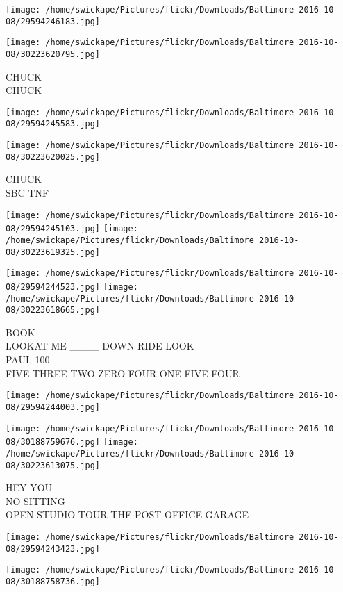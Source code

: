\documentclass[10pt,letterpaper]{article}
\begin{document}
\texttt{[image: /home/swickape/Pictures/flickr/Downloads/Baltimore 2016-10-08/29594246183.jpg]}

\vspace{0.25in}
\texttt{[image: /home/swickape/Pictures/flickr/Downloads/Baltimore 2016-10-08/30223620795.jpg]}

CHUCK\\
CHUCK
\pagebreak

\texttt{[image: /home/swickape/Pictures/flickr/Downloads/Baltimore 2016-10-08/29594245583.jpg]}

\vspace{0.25in}
\texttt{[image: /home/swickape/Pictures/flickr/Downloads/Baltimore 2016-10-08/30223620025.jpg]}

CHUCK\\
SBC TNF
\pagebreak

\texttt{[image: /home/swickape/Pictures/flickr/Downloads/Baltimore 2016-10-08/29594245103.jpg]}
\texttt{[image: /home/swickape/Pictures/flickr/Downloads/Baltimore 2016-10-08/30223619325.jpg]}

\texttt{[image: /home/swickape/Pictures/flickr/Downloads/Baltimore 2016-10-08/29594244523.jpg]}
\texttt{[image: /home/swickape/Pictures/flickr/Downloads/Baltimore 2016-10-08/30223618665.jpg]}

BOOK\\
LOOKAT ME \_\_\_\_ DOWN RIDE LOOK\\
PAUL 100\\
FIVE THREE TWO ZERO FOUR ONE FIVE FOUR
\pagebreak

\texttt{[image: /home/swickape/Pictures/flickr/Downloads/Baltimore 2016-10-08/29594244003.jpg]}

\vspace{0.25in}
\texttt{[image: /home/swickape/Pictures/flickr/Downloads/Baltimore 2016-10-08/30188759676.jpg]}
\texttt{[image: /home/swickape/Pictures/flickr/Downloads/Baltimore 2016-10-08/30223613075.jpg]}

HEY YOU\\
NO SITTING\\
OPEN STUDIO TOUR THE POST OFFICE GARAGE
\pagebreak

\texttt{[image: /home/swickape/Pictures/flickr/Downloads/Baltimore 2016-10-08/29594243423.jpg]}

\vspace{0.25in}
\texttt{[image: /home/swickape/Pictures/flickr/Downloads/Baltimore 2016-10-08/30188758736.jpg]}
\end{document}
